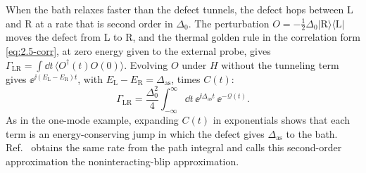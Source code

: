 When the bath relaxes faster than the defect tunnels, the defect hops between L and R at a rate that is second order in $\Delta_0$. The perturbation $O = -\tfrac12\Delta_0|\mathrm{R}\rangle\langle\mathrm{L}|$ moves the defect from L to R, and the thermal golden rule in the correlation form \cref{eq:2.5-corr}, at zero energy given to the external probe, gives $\varGamma_{\mathrm{LR}} = \int\dd t\,\langle O^\dagger(t)O(0)\rangle$. Evolving $O$ under $H$ without the tunneling term gives $\ee^{\ii(E_{\mathrm{L}} - E_{\mathrm{R}})t}$, with $E_{\mathrm{L}} - E_{\mathrm{R}} = \Delta_{\mathrm{as}}$, times $C(t)$:
\begin{equation}
  \varGamma_{\mathrm{LR}} = \frac{\Delta_0^2}{4}\int_{-\infty}^{\infty}\dd t\,\ee^{\ii\Delta_{\mathrm{as}}t}\,\ee^{-\mathcal{Q}(t)} .
  \label{eq:C.20-rate}
\end{equation}
As in the one-mode example, expanding $C(t)$ in exponentials shows that each term is an energy-conserving jump in which the defect gives $\Delta_{\mathrm{as}}$ to the bath. Ref.~\cite{leggett1987dynamics} obtains the same rate from the path integral and calls this second-order approximation the noninteracting-blip approximation.

